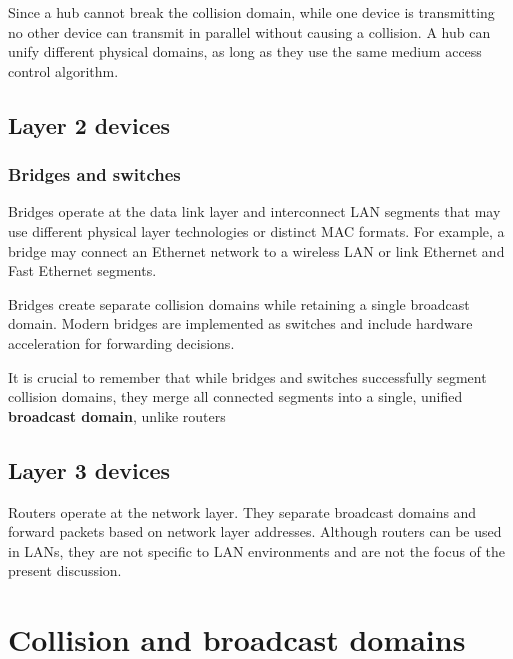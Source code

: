 Since a hub cannot break the collision domain, while one device is transmitting no other device can transmit in parallel without causing a collision. A hub can unify different physical domains, as long as they use the same medium access control algorithm. 
\subsection{Layer 2 devices}

\subsubsection*{Bridges and switches}

Bridges operate at the data link layer and interconnect LAN segments that may use different physical layer technologies or distinct MAC formats. For example, a bridge may connect an Ethernet network to a wireless LAN or link Ethernet and Fast Ethernet segments.

Bridges create separate collision domains while retaining a single broadcast domain. Modern bridges are implemented as switches and include hardware acceleration for forwarding decisions.

\begin{center}
\end{center}

It is crucial to remember that while bridges and switches successfully segment collision domains, they merge all connected segments into a single, unified \textbf{broadcast domain}, unlike routers

\begin{center}
\end{center}

\subsection{Layer 3 devices}

Routers operate at the network layer. They separate broadcast domains and forward packets based on network layer addresses. Although routers can be used in LANs, they are not specific to LAN environments and are not the focus of the present discussion.

\section{Collision and broadcast domains}

